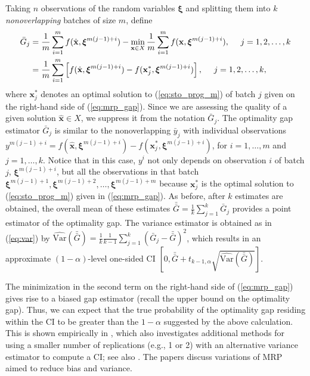 \documentclass[12pt]{article}
\newcommand{\e}[1]{\mathbb{E} \left[ #1 \right]
}
\newcommand{\varh}[1]{\widehat{\mathrm{Var}} \left( #1 \right)}
\newcommand{\X}{X}
\newcommand{\x}{\mathbf{x}}
\newcommand{\xh}{{\hat{\x}}}
\newcommand{\xs}{\x^*}
\newcommand{\xit}{\boldsymbol{\xi}}
\newcommand{\zs}{z^*}
\newcommand{\gb}{\bar{G}}
\newcommand{\gbb}{\bar{\gb}}
\newcommand{\yb}{\bar{y}}
\begin{document}

Taking $n$ observations of the random variables $\xit$ and splitting them into $k$ {\it nonoverlapping} batches of size $m$, define 
\begin{align} 
	\gb_j  & = \frac{1}{m} \sum_{i = 1}^{m} f(\xh, \xit^{m(j-1)+i}) - \min_{\x \in X} \frac{1}{m} \sum_{i=1}^{m} f(\x, \xit^{m(j-1)+i}), \ \ \ \ j = 1,2, \dots, k \label{eq:mrp_gap}\\
         & = \frac{1}{m} \sum_{i = 1}^{m} \left[ f(\xh, \xit^{m(j-1)+i}) -  f(\xs_j, \xit^{m(j-1)+i}) \right], \ \ \ \ j = 1,2, \dots, k, \notag
\end{align}
where $\xs_j$ denotes an optimal solution to (\ref{eq:sto_prog_m}) of batch $j$ given on the right-hand side of (\ref{eq:mrp_gap}).    
Since we are assessing the quality of a given solution $\xh \in \X$, we suppress it from the notation $\gb_j$.
The optimality gap estimator $\gb_j$ is similar to the nonoverlapping $\yb_j$ with individual observations $y^{m(j-1)+i} = f(\xh,\xit^{m(j-1)+i}) - f(\xs_j,\xit^{m(j-1)+i})$, for $i=1,\ldots,m$ and $j=1,\ldots, k$.
Notice that in this case, $y^i$ not only depends on observation $i$ of batch $j$, $\xit^{m(j-1)+i}$, but all the observations in that batch $\xit^{m(j-1)+1},\xit^{m(j-1)+2},\ldots,\xit^{m(j-1)+m}$ because $\xs_j$ is the optimal solution to (\ref{eq:sto_prog_m}) given in (\ref{eq:mrp_gap}).   
As before, after $k$ estimates are obtained, the overall mean of these estimates $\gbb = \frac{1}{k} \sum_{j=1}^k \gb_j$ provides a point estimator of the optimality gap.  
The variance estimator is obtained as in (\ref{eq:var}) by $\varh{\gbb} = \frac{1}{k} \frac{1}{k-1} \sum_{j=1}^k (\gb_j - \gbb)^2$, which results in an approximate $(1-\alpha)$-level one-sided CI $\left[0, \gbb + t_{k-1,\alpha} \sqrt{\varh{\gbb}} \right]$.

The minimization in the second term on the right-hand side of (\ref{eq:mrp_gap}) gives rise to a biased gap estimator (recall the upper bound on the optimality gap).  
Thus, we can expect that the true probability of the optimality gap residing within the CI to be greater than the $1 - \alpha$ suggested by the above calculation.  
This is shown empirically in \citep{Bayraksan2006}, which also investigates additional methods for using a smaller number of replications (e.g., 1 or 2) with an alternative variance estimator to compute a CI; see also \citep{stockbridge_bayraksan_13}. 
The papers \citep{bayraksan_morton_09,partani2006jackknife,partani_07} discuss variations of MRP aimed to reduce bias and variance.
\end{document}

